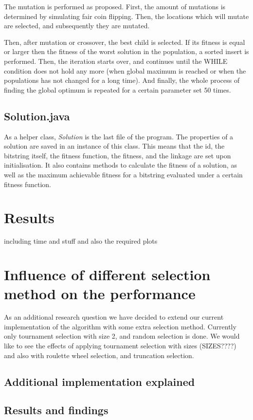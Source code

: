 \documentclass[10pt,a4paper,onecolumn]{article}
\begin{document}
The mutation is performed as proposed. First, the amount of mutations is determined by simulating fair coin flipping. Then, the locations which will mutate are selected, and subsequently they are mutated.

Then, after mutation or crossover, the best child is selected. If its fitness is equal or larger then the fitness of the worst solution in the population, a sorted insert is performed. Then, the iteration starts over, and continues until the WHILE condition does not hold any more (when global maximum is reached or when the populations has not changed for a long time). And finally, the whole process of finding the global optimum is repeated for a certain parameter set 50 times.

\subsection{Solution.java}
As a helper class, \textit{Solution} is the last file of the program. The properties of a solution are saved in an instance of this class. This means that the id, the bitstring itself, the fitness function, the fitness, and the linkage are set upon initialisation. It also contains methods to calculate the fitness of a solution, as well as the maximum achievable fitness for a bitstring evaluated under a certain fitness function.

\section{Results} \label{sec:results}
including time and stuff
and also the required plots

\section{Influence of different selection method on the performance}
\label{sec:research}
As an additional research question we have decided to extend our current implementation of the algorithm with some extra selection method. Currently only tournament selection with size 2, and random selection is done. We would like to see the effects of applying tournament selection with sizes (SIZES????) and also with roulette wheel selection, and truncation selection.

\subsection{Additional implementation explained}

\subsection{Results and findings}
\end{document}
